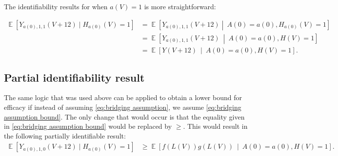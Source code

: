 \documentclass[12pt]{article}
\theoremstyle{definition}
\DeclareMathOperator{\cE}{\mathbb{E}}
\newcommand{\Hopen}{V}
\begin{document}
The identifiability results for when $a(\Hopen) = 1$ is more straightforward:

\begin{align*}
    \cE[Y_{a(0),1,1}(\Hopen+12)\mid H_{a(0)}(\Hopen)=1]&= \cE\left[Y_{a(0),1,1}(\Hopen+12) \middle|\  A(0)=a(0),H_{a(0)}(\Hopen)=1\right] \\
    &= \cE\left[Y_{a(0),1,1}(\Hopen+12)\ \middle|\  A(0)=a(0),H(\Hopen)=1\right]\\
    &= \cE\left[Y(\Hopen+12)\ \middle|\  A(0)=a(0),H(\Hopen)=1\right].
\end{align*}

\subsection{Partial identifiability result}
The same logic that was used above can be applied to obtain a lower bound for efficacy if instead of assuming \eqref{eq:bridging assumption}, we assume \eqref{eq:bridging assumption bound}.  The only change that would occur is that the equality given in \eqref{eq:bridging assumption bound} would be replaced by $\geq$.  This would result in the following partially identifiable result:
\begin{align*}
    \cE[Y_{a(0),1,0}(\Hopen+12)\mid H_{a(0)}(\Hopen)=1]& \geq \cE\left[f(L(\Hopen)) g(L(\Hopen))\ \middle|\  A(0)=a(0),H(\Hopen)=1\right].
\end{align*}
\end{document}
